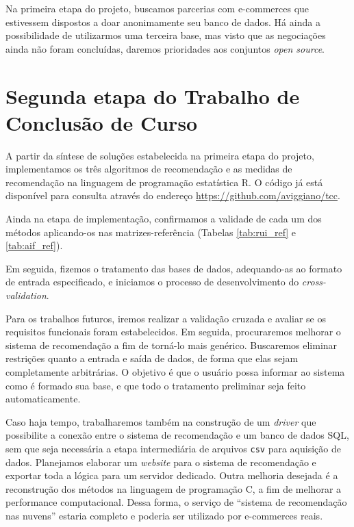 Na primeira etapa do projeto, buscamos parcerias com e-commerces que estivessem dispostos a doar anonimamente seu banco de dados. Há ainda a possibilidade de utilizarmos uma terceira base, mas visto que as negociações ainda não foram concluídas, daremos prioridades aos conjuntos \textit{open source}.  

\section{Segunda etapa do Trabalho de Conclusão de Curso} %
\label{sec:segunda_etapa_do_trabalho_de_conclus_o_de_curso}


A partir da síntese de soluções estabelecida na primeira etapa do projeto, implementamos os três algoritmos de recomendação e as medidas de recomendação na linguagem de programação estatística R. O código já está disponível para consulta através do endereço \url{https://github.com/aviggiano/tcc}.

Ainda na etapa de implementação, confirmamos a validade de cada um dos métodos aplicando-os nas matrizes-referência (Tabelas \ref{tab:rui_ref} e \ref{tab:aif_ref}). 

Em seguida, fizemos o tratamento das bases de dados, adequando-as ao formato de entrada especificado, e  iniciamos o processo de desenvolvimento do \textit{cross-validation}.

Para os trabalhos futuros, iremos realizar a validação cruzada e avaliar se os requisitos funcionais foram estabelecidos. Em seguida, procuraremos melhorar o sistema de recomendação a fim de torná-lo mais genérico. Buscaremos eliminar restrições quanto a entrada e saída de dados, de forma que elas sejam completamente arbitrárias. O objetivo é que o usuário possa informar ao sistema como é formado sua base, e que todo o tratamento preliminar seja feito automaticamente. 

Caso haja tempo, trabalharemos também na construção de um \textit{driver} que possibilite a conexão entre o sistema de recomendação e um banco de dados SQL, sem que seja necessária a etapa intermediária de arquivos \texttt{csv} para aquisição de dados. Planejamos elaborar um \textit{website} para o sistema de recomendação e exportar toda a lógica para um servidor dedicado. Outra melhoria desejada é a reconstrução dos métodos na linguagem de programação C, a fim de melhorar a performance computacional. Dessa forma, o serviço de ``sistema de recomendação nas nuvens'' estaria completo e poderia ser utilizado por e-commerces reais.